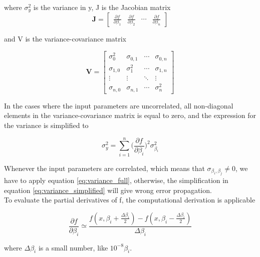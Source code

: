 \documentclass[a4paper,11pt,twoside]{book}
\begin{document}
\noindent where $\sigma^2_y$ is the variance in y, J is the Jacobian matrix
\begin{equation}
\mathbf{J} = 
    \begin{bmatrix}
       \frac{\partial f}{\partial \beta_1} &  \frac{\partial f}{\partial \beta_2} & \cdots & \frac{ \partial f}{\partial \beta_n}
    \end{bmatrix}
\end{equation}

\noindent and V is the variance-covariance matrix 

\begin{equation}
\mathbf{V} = 
\begin{bmatrix}
  \sigma_0^2 & \sigma_{0,1} & \cdots & \sigma_{0,n} \\
  \sigma_{1,0} & \sigma_{1}^2 & \cdots & \sigma_{1,n} \\
  \vdots  & \vdots  & \ddots & \vdots  \\
  \sigma_{n,0} & \sigma_{n,1} & \cdots & \sigma_{n}^2
 \end{bmatrix}
\end{equation}


\noindent In the cases where the input parameters are uncorrelated, all non-diagonal elements in the variance-covariance matrix is equal to zero, and the expression for the variance is simplified to 

\begin{equation} \label{eq:variance_simplified}
    \sigma_y^2 = \sum_{i=1}^n \Big(\frac{\partial f}{\partial \beta_i } \Big)^2 \sigma_{\beta_i}^2
\end{equation}

\noindent Whenever the input parameters are correlated, which means that $\sigma_{\beta_i, \beta_j}\neq 0$, we have to apply equation \ref{eq:variance_full}, otherwise, the simplification in equation \ref{eq:variance_simplified} will give wrong error propagation. \\

\noindent To evaluate the partial derivatives of f, the computational derivation is applicable

\begin{equation}
    \frac{\partial f}{\partial \beta_i} \simeq\frac{f(x, \beta_i + \frac{\Delta \beta_i}{2}) - f(x, \beta_i-\frac{\Delta \beta_i}{2})}{\Delta \beta_i}
\end{equation}

\noindent where $\Delta\beta_i$ is a small number, like $10^{-8}\beta_i$. \\
\end{document}
